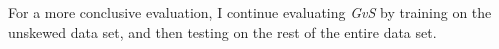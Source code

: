 For a more conclusive evaluation, I continue evaluating {\it GvS} by training on the unskewed data set, and then testing on the rest of the entire data set.
%
%
%
%
